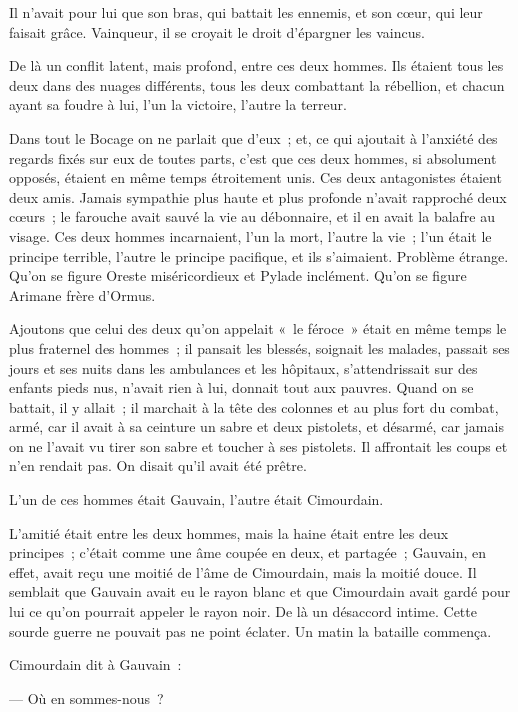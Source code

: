 \documentclass[french,twoside]{book} %
\begin{document}
Il n’avait pour lui que son bras, qui battait les ennemis, et son cœur, qui leur faisait grâce. Vainqueur, il se croyait le droit d’épargner les vaincus.\par
De là un conflit latent, mais profond, entre ces deux hommes. Ils étaient tous les deux dans des nuages différents, tous les deux combattant la rébellion, et chacun ayant sa foudre à lui, l’un la victoire, l’autre la terreur.\par
Dans tout le Bocage on ne parlait que d’eux ; et, ce qui ajoutait à l’anxiété des regards fixés sur eux de toutes parts, c’est que ces deux hommes, si absolument opposés, étaient en même temps étroitement  unis. Ces deux antagonistes étaient deux amis. Jamais sympathie plus haute et plus profonde n’avait rapproché deux cœurs ; le farouche avait sauvé la vie au débonnaire, et il en avait la balafre au visage. Ces deux hommes incarnaient, l’un la mort, l’autre la vie ; l’un était le principe terrible, l’autre le principe pacifique, et ils s’aimaient. Problème étrange. Qu’on se figure Oreste miséricordieux et Pylade inclément. Qu’on se figure Arimane frère d’Ormus.\par
Ajoutons que celui des deux qu’on appelait « le féroce » était en même temps le plus fraternel des hommes ; il pansait les blessés, soignait les malades, passait ses jours et ses nuits dans les ambulances et les hôpitaux, s’attendrissait sur des enfants pieds nus, n’avait rien à lui, donnait tout aux pauvres. Quand on se battait, il y allait ; il marchait à la tête des colonnes et au plus fort du combat, armé, car il avait à sa ceinture un sabre et deux pistolets, et désarmé, car jamais on ne l’avait vu tirer son sabre et toucher à ses pistolets. Il affrontait les coups et n’en rendait pas. On disait qu’il avait été prêtre.\par
L’un de ces hommes était Gauvain, l’autre était Cimourdain.\par
L’amitié était entre les deux hommes, mais la haine était entre les deux principes ; c’était comme une âme coupée en deux, et partagée ; Gauvain, en effet, avait reçu une moitié de l’âme de Cimourdain, mais la moitié douce. Il semblait que Gauvain avait eu le rayon blanc et que Cimourdain avait gardé pour lui ce qu’on pourrait appeler le rayon noir. De là un  désaccord intime. Cette sourde guerre ne pouvait pas ne point éclater. Un matin la bataille commença.\par
Cimourdain dit à Gauvain :\par
— Où en sommes-nous ?\par
\end{document}
